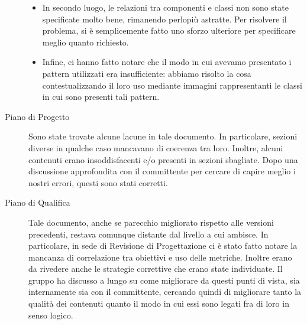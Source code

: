 \begin{description}
\begin{itemize}
				\item In secondo luogo, le relazioni tra componenti e classi non sono state specificate molto bene, rimanendo perlopiù astratte. Per risolvere il problema, si è semplicemente fatto uno sforzo ulteriore per specificare meglio quanto richiesto.
				\item Infine, ci hanno fatto notare che il modo in cui avevamo presentato i pattern utilizzati era insufficiente: abbiamo risolto la cosa contestualizzando il loro uso mediante immagini rappresentanti le classi in cui sono presenti tali pattern.
			\end{itemize}
			\item[Piano di Progetto] Sono state trovate alcune lacune in tale documento. In particolare, sezioni diverse in qualche caso mancavano di coerenza tra loro. Inoltre, alcuni contenuti erano insoddisfacenti e/o presenti in sezioni sbagliate. Dopo una discussione approfondita con il committente per cercare di capire meglio i nostri errori, questi sono stati corretti.
			\item[Piano di Qualifica] Tale documento, anche se parecchio migliorato rispetto alle versioni precedenti, restava comunque distante dal livello a cui ambisce. In particolare, in sede di Revisione di Progettazione ci è stato fatto notare la mancanza di correlazione tra obiettivi e uso delle metriche. Inoltre erano da rivedere anche le strategie correttive che erano state individuate. Il gruppo ha discusso a lungo su come migliorare da questi punti di vista, sia internamente sia con il committente, cercando quindi di migliorare tanto la qualità dei contenuti quanto il modo in cui essi sono legati fra di loro in senso logico.
		\end{description}